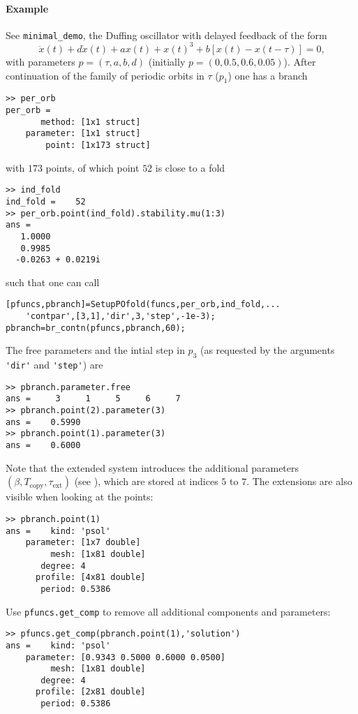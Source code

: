 \documentclass[11pt]{scrartcl}
\newcommand{\blist}[1]{\mbox{\lstinline!#1!}}
\begin{document}
\paragraph{Example}
See \texttt{minimal\_demo}, the Duffing oscillator with delayed feedback of the form
\begin{equation}\label{eq:duff}
  \ddot x(t)+d \dot x(t)+a x(t)+x(t)^3+b[x(t)-x(t-\tau)]=0\mbox{,}
\end{equation}
with parameters $p=(\tau,a,b,d)$ (initially $p=(0, 0.5, 0.6, 0.05)$).
After continuation of the family of periodic orbits in $\tau$ ($p_1$)
one has a branch
{\small
\begin{verbatim}
>> per_orb
per_orb = 
       method: [1x1 struct]
    parameter: [1x1 struct]
        point: [1x173 struct]
\end{verbatim}
} with $173$ points, of which point $52$ is close to a fold
\begin{verbatim}
>> ind_fold
ind_fold =    52
>> per_orb.point(ind_fold).stability.mu(1:3)
ans =
   1.0000          
   0.9985          
  -0.0263 + 0.0219i
\end{verbatim}
such that one can call
\begin{lstlisting}
[pfuncs,pbranch]=SetupPOfold(funcs,per_orb,ind_fold,...
    'contpar',[3,1],'dir',3,'step',-1e-3);
pbranch=br_contn(pfuncs,pbranch,60);
\end{lstlisting}
The free parameters and the intial step in $p_3$ (as requested by
the arguments \blist{'dir'} and \blist{'step'}) are
\begin{verbatim}
>> pbranch.parameter.free
ans =     3     1     5     6     7
>> pbranch.point(2).parameter(3)
ans =    0.5990
>> pbranch.point(1).parameter(3)
ans =    0.6000
\end{verbatim}
Note that the extended system introduces the additional parameters
$(\beta,T_\mathrm{copy},\tau_\mathrm{ext})$ (see \cite{S13}), which
are stored at indices $5$ to $7$. The extensions are also visible when
looking at the points:
\begin{verbatim}
>> pbranch.point(1)
ans =    kind: 'psol'
    parameter: [1x7 double]
         mesh: [1x81 double]
       degree: 4
      profile: [4x81 double]
       period: 0.5386
\end{verbatim}
Use \blist{pfuncs.get_comp} to remove all additional components and parameters:
\begin{verbatim}
>> pfuncs.get_comp(pbranch.point(1),'solution')
ans =    kind: 'psol'
    parameter: [0.9343 0.5000 0.6000 0.0500]
         mesh: [1x81 double]
       degree: 4
      profile: [2x81 double]
       period: 0.5386
\end{verbatim}
\end{document}
